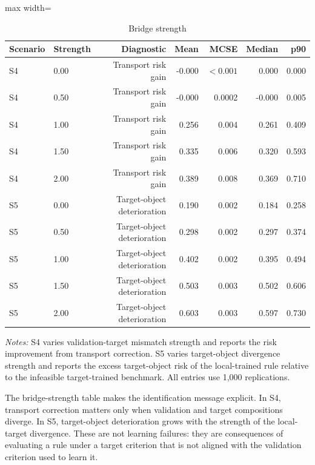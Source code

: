 \documentclass[a4paper,12pt]{article}
\newcommand{\1}{\mathbf{1}}
\newcommand{\ExhibitNote}[1]{\begin{minipage}{0.94\textwidth}\footnotesize\emph{Notes:} #1\end{minipage}}
\begin{document}
\begin{table}[H]
\centering
\caption{Bridge strength}
\label{tab:ia_mc_bridge_strength}
\small
\begin{adjustbox}{max width=\textwidth}
\begin{tabular}{@{}llrrrrr@{}}
\toprule
Scenario & Strength & Diagnostic & Mean & MCSE & Median & p90 \\
\midrule
S4 & 0.00 & Transport risk gain & -0.000 & $<0.001$ & 0.000 & 0.000 \\
S4 & 0.50 & Transport risk gain & -0.000 & 0.0002 & -0.000 & 0.005 \\
S4 & 1.00 & Transport risk gain & 0.256 & 0.004 & 0.261 & 0.409 \\
S4 & 1.50 & Transport risk gain & 0.335 & 0.006 & 0.320 & 0.593 \\
S4 & 2.00 & Transport risk gain & 0.389 & 0.008 & 0.369 & 0.710 \\
S5 & 0.00 & Target-object deterioration & 0.190 & 0.002 & 0.184 & 0.258 \\
S5 & 0.50 & Target-object deterioration & 0.298 & 0.002 & 0.297 & 0.374 \\
S5 & 1.00 & Target-object deterioration & 0.402 & 0.002 & 0.395 & 0.494 \\
S5 & 1.50 & Target-object deterioration & 0.503 & 0.003 & 0.502 & 0.606 \\
S5 & 2.00 & Target-object deterioration & 0.603 & 0.003 & 0.597 & 0.730 \\
\bottomrule
\end{tabular}
\end{adjustbox}
\par\medskip
\ExhibitNote{S4 varies validation-target mismatch strength and reports the risk improvement from transport correction. S5 varies target-object divergence strength and reports the excess target-object risk of the local-trained rule relative to the infeasible target-trained benchmark. All entries use 1,000 replications.}
\end{table}

The bridge-strength table makes the identification message explicit. In S4, transport correction matters only when validation and target compositions diverge. In S5, target-object deterioration grows with the strength of the local-target divergence. These are not learning failures: they are consequences of evaluating a rule under a target criterion that is not aligned with the validation criterion used to learn it.



\end{document}
